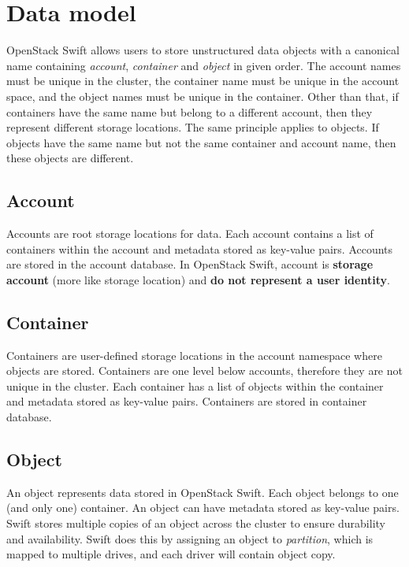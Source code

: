     \section{Data model}
    OpenStack Swift allows users to store unstructured data objects with a canonical name containing \textit{account}, \textit{container} and \textit{object} in given order\cite{swiftOpenStackSwift}. The account names must be unique in the cluster, the container name must be unique in the account space, and the object names must be unique in the container. Other than that, if containers have the same name but belong to a different account, then they represent different storage locations. The same principle applies to objects. If objects have the same name but not the same container and account name, then these objects are different.

    \subsection{Account}
    Accounts are root storage locations for data. Each account contains a list of containers within the account and metadata stored as key-value pairs. Accounts are stored in the account database. In OpenStack Swift, account is \textbf{storage account} (more like storage location) and \textbf{do not represent a user identity}\cite{swiftOpenStackSwift}.

    \subsection{Container}
    Containers are user-defined storage locations in the account namespace where objects are stored. Containers are one level below accounts, therefore they are not unique in the cluster. Each container has a list of objects within the container and metadata stored as key-value pairs. Containers are stored in container database\cite{swiftOpenStackSwift}.

    \subsection{Object}
    An object represents data stored in OpenStack Swift. Each object belongs to one (and only one) container. An object can have metadata stored as key-value pairs. Swift stores multiple copies of an object across the cluster to ensure durability and availability. Swift does this by assigning an object to \textit{partition}, which is mapped to multiple drives, and each driver will contain object copy\cite{swiftOpenStackSwift}.

